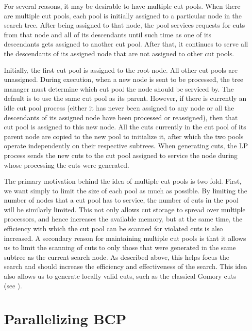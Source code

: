 For several reasons, it may be desirable to have multiple cut pools.
When there are multiple cut pools, each pool is initially assigned
to a particular node in the search tree. After being assigned to that
node, the pool services requests for cuts from that node and all
of its descendants until such time as one of its descendants gets
assigned to another cut pool. After that, it continues to
serve all the descendants of its assigned node that are not assigned
to other cut pools.

Initially, the first cut pool is assigned to the root
node. All other cut pools are unassigned. During execution, when a new
node is sent to be processed, the tree manager must determine
which cut pool the node should be serviced by. The default is to use
the same cut pool as its parent. However, if there is currently an
idle cut pool process (either it has never been assigned to any node
or all the descendants of its assigned node have been processed or
reassigned), then that cut pool is assigned to this new node. All the
cuts currently in the cut pool of its parent node are copied to the
new pool to initialize it, after which the two pools operate
independently on their respective subtrees. When generating cuts, the
LP process sends the new cuts to the cut pool assigned to
service the node during whose processing the cuts were generated.

The primary motivation behind the idea of multiple cut pools is
two-fold. First, we want simply to limit the size of each pool as
much as possible. By limiting the number of nodes that a cut pool has
to service, the number of cuts in the pool will be similarly limited.
This not only allows cut storage to spread over multiple processors,
and hence increases the available memory, but at the same time, the
efficiency with which the cut pool can be scanned for violated cuts is
also increased. A secondary reason for maintaining multiple cut pools is
that it allows us to limit the scanning of cuts to only those that
were generated in the same subtree as the current search node. As
described above, this helps focus the search and should increase the
efficiency and effectiveness of the search. This idea also
allows us to generate locally valid cuts, such as the classical
Gomory cuts (see \cite{N&W}).

\section{Parallelizing BCP}
\label{parallelizing}

